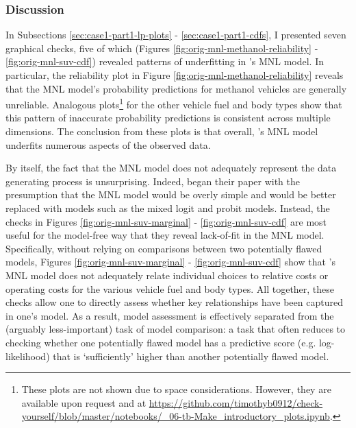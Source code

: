 \documentclass[preprint]{elsarticle}
\begin{document}
\subsubsection{Discussion}
\label{sec:case1-part1-discussion}
In Subsections \ref{sec:case1-part1-lp-plots} - \ref{sec:case1-part1-cdfs}, I presented seven graphical checks, five of which (Figures \ref{fig:orig-mnl-methanol-reliability} - \ref{fig:orig-mnl-suv-cdf}) revealed patterns of underfitting in \citeauthor{brownstone_forecasting_1998}'s MNL model. In particular, the reliability plot in Figure \ref{fig:orig-mnl-methanol-reliability} reveals that the MNL model's probability predictions for methanol vehicles are generally unreliable. Analogous plots\footnote{These plots are not shown due to space considerations. However, they are available upon request and at \url{https://github.com/timothyb0912/check-yourself/blob/master/notebooks/_06-tb-Make_introductory_plots.ipynb}.} for the other vehicle fuel and body types show that this pattern of inaccurate probability predictions is consistent across multiple dimensions. The conclusion from these plots is that overall, \citeauthor{brownstone_forecasting_1998}'s MNL model underfits numerous aspects of the observed data.

By itself, the fact that the MNL model does not adequately represent the data generating process is unsurprising. Indeed, \citet{brownstone_forecasting_1998} began their paper with the presumption that the MNL model would be overly simple and would be better replaced with models such as the mixed logit and probit models. Instead, the checks in Figures \ref{fig:orig-mnl-suv-marginal} - \ref{fig:orig-mnl-suv-cdf} are most useful for the model-free way that they reveal lack-of-fit in the MNL model. Specifically, without relying on comparisons between two potentially flawed models, Figures \ref{fig:orig-mnl-suv-marginal} - \ref{fig:orig-mnl-suv-cdf} show that \citeauthor{brownstone_forecasting_1998}'s MNL model does not adequately relate individual choices to relative costs or operating costs for the various vehicle fuel and body types. All together, these checks allow one to directly assess whether key relationships have been captured in one's model. As a result, model assessment is effectively separated from the (arguably less-important) task of model comparison: a task that often reduces to checking whether one potentially flawed model has a predictive score (e.g. log-likelihood) that is `sufficiently' higher than another potentially flawed model.
\end{document}

